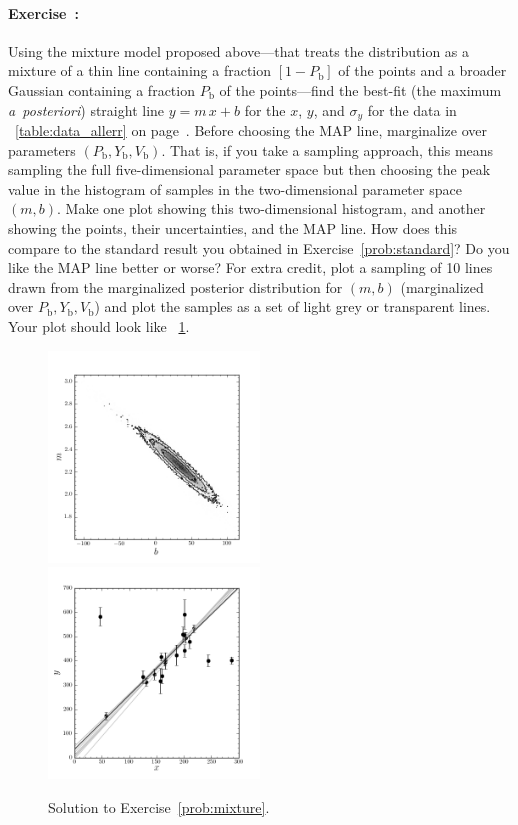 \documentclass[12pt,twoside]{article}
\newcommand{\notenglish}[1]{\textsl{#1}}
\newcommand{\aposteriori}{\notenglish{a~posteriori}}
\newcommand{\problemname}{Exercise}
\newcounter{problem}
\newenvironment{problem}{\paragraph{\problemname~\theproblem:}\refstepcounter{problem}}{}
\newcommand{\Pbad}{P_{\mathrm{b}}}
\newcommand{\Ybad}{Y_{\mathrm{b}}}
\newcommand{\Vbad}{V_{\mathrm{b}}}
\begin{document}
\begin{problem}\label{prob:mixture}
Using the mixture model proposed above---that treats the distribution
as a mixture of a thin line containing a fraction $[1-\Pbad]$ of the
points and a broader Gaussian containing a fraction $\Pbad$ of the
points---find the best-fit (the maximum \aposteriori) straight line
$y=m\,x+b$ for the $x$, $y$, and $\sigma_y$ for the data in
\tablename~\ref{table:data_allerr} on
page~\pageref{table:data_allerr}.  Before choosing the MAP line,
marginalize over parameters $(\Pbad,\Ybad,\Vbad)$.  That is, if you
take a sampling approach, this means sampling the full
five-dimensional parameter space but then choosing the peak value in
the histogram of samples in the two-dimensional parameter space
$(m,b)$.  Make one plot showing this two-dimensional histogram, and
another showing the points, their uncertainties, and the MAP line.
How does this compare to the standard result you obtained in
\problemname~\ref{prob:standard}?  Do you like the MAP line better or
worse?  For extra credit, plot a sampling of 10 lines drawn from the
marginalized posterior distribution for $(m,b)$ (marginalized over
$\Pbad,\Ybad,\Vbad$) and plot the samples as a set of light grey or
transparent lines.  Your plot should look like
\figurename~\ref{fig:mixture}.
\end{problem}

\begin{figure}[htb]
\includegraphics[width=0.5\textwidth]{exMix1a.png}
\includegraphics[width=0.5\textwidth]{exMix1b.png}
\caption{Solution to \problemname~\ref{prob:mixture}.}\label{fig:mixture}
\end{figure}
\end{document}
